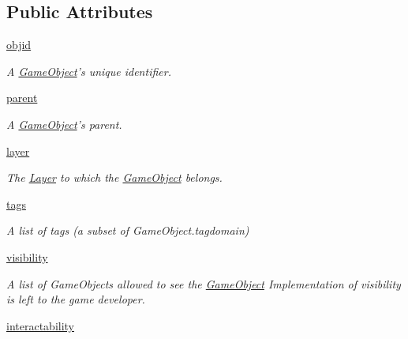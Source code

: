 \subsection*{\-Public \-Attributes}
\begin{DoxyCompactItemize}
\item 
\hyperlink{classGameObject_1_1GameObject_ac9ae5ed4d040061ff584751e20799a7a}{objid}
\begin{DoxyCompactList}\small\item\em \-A \hyperlink{classGameObject_1_1GameObject}{\-Game\-Object}'s unique identifier. \end{DoxyCompactList}\item 
\hyperlink{classGameObject_1_1GameObject_aa496066be50cb5918bc7cbf56d14cf7a}{parent}
\begin{DoxyCompactList}\small\item\em \-A \hyperlink{classGameObject_1_1GameObject}{\-Game\-Object}'s parent. \end{DoxyCompactList}\item 
\hypertarget{classGameObject_1_1GameObject_aef72ecd07ce7acb7245f42dd7f307c04}{\hyperlink{classGameObject_1_1GameObject_aef72ecd07ce7acb7245f42dd7f307c04}{layer}}\label{classGameObject_1_1GameObject_aef72ecd07ce7acb7245f42dd7f307c04}

\begin{DoxyCompactList}\small\item\em \-The \hyperlink{classGameObject_1_1Layer}{\-Layer} to which the \hyperlink{classGameObject_1_1GameObject}{\-Game\-Object} belongs. \end{DoxyCompactList}\item 
\hypertarget{classGameObject_1_1GameObject_a77b43e6eb78d01f16bb5b098d62d53d4}{\hyperlink{classGameObject_1_1GameObject_a77b43e6eb78d01f16bb5b098d62d53d4}{tags}}\label{classGameObject_1_1GameObject_a77b43e6eb78d01f16bb5b098d62d53d4}

\begin{DoxyCompactList}\small\item\em \-A list of tags (a subset of \-Game\-Object.\-tagdomain) \end{DoxyCompactList}\item 
\hypertarget{classGameObject_1_1GameObject_a39bf412c9900083432b58f2dbbe1d5fb}{\hyperlink{classGameObject_1_1GameObject_a39bf412c9900083432b58f2dbbe1d5fb}{visibility}}\label{classGameObject_1_1GameObject_a39bf412c9900083432b58f2dbbe1d5fb}

\begin{DoxyCompactList}\small\item\em \-A list of \-Game\-Objects allowed to see the \hyperlink{classGameObject_1_1GameObject}{\-Game\-Object} \-Implementation of visibility is left to the game developer. \end{DoxyCompactList}\item 
\hypertarget{classGameObject_1_1GameObject_aa48d265929b12d794a9ac630046b74cf}{\hyperlink{classGameObject_1_1GameObject_aa48d265929b12d794a9ac630046b74cf}{interactability}}\label{classGameObject_1_1GameObject_aa48d265929b12d794a9ac630046b74cf}


\end{DoxyCompactItemize}
